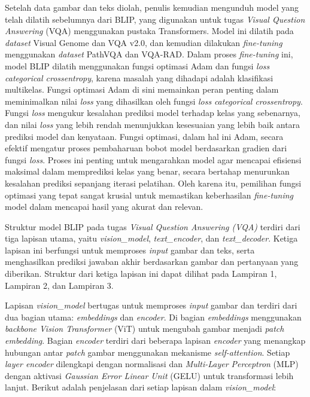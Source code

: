 \par Setelah data gambar dan teks diolah, penulis kemudian mengunduh model yang telah dilatih sebelumnya dari BLIP, yang digunakan untuk tugas \textit{Visual Question Answering} (VQA) menggunakan pustaka Transformers. Model ini dilatih pada \textit{dataset} Visual Genome dan VQA v2.0, dan kemudian dilakukan \textit{fine-tuning} menggunakan \textit{dataset} PathVQA dan VQA-RAD. Dalam proses \textit{fine-tuning} ini, model BLIP dilatih menggunakan fungsi optimasi Adam dan fungsi \textit{loss} \textit{categorical crossentropy}, karena masalah yang dihadapi adalah klasifikasi multikelas. Fungsi optimasi Adam di sini memainkan peran penting dalam meminimalkan nilai \textit{loss} yang dihasilkan oleh fungsi \textit{loss} \textit{categorical crossentropy}. Fungsi \textit{loss} mengukur kesalahan prediksi model terhadap kelas yang sebenarnya, dan nilai \textit{loss} yang lebih rendah menunjukkan kesesuaian yang lebih baik antara prediksi model dan kenyataan. Fungsi optimasi, dalam hal ini Adam, secara efektif mengatur proses pembaharuan bobot model berdasarkan gradien dari fungsi \textit{loss}. Proses ini penting untuk mengarahkan model agar mencapai efisiensi maksimal dalam memprediksi kelas yang benar, secara bertahap menurunkan kesalahan prediksi sepanjang iterasi pelatihan. Oleh karena itu, pemilihan fungsi optimasi yang tepat sangat krusial untuk memastikan keberhasilan \textit{fine-tuning} model dalam mencapai hasil yang akurat dan relevan. 

\par Struktur model BLIP pada tugas \textit{Visual Question Answering (VQA)} terdiri dari tiga lapisan utama, yaitu \textit{vision\_model}, \textit{text\_encoder}, dan \textit{text\_decoder}. Ketiga lapisan ini berfungsi untuk memproses \textit{input} gambar dan teks, serta menghasilkan prediksi jawaban akhir berdasarkan gambar dan pertanyaan yang diberikan. Struktur dari ketiga lapisan ini dapat dilihat pada Lampiran 1, Lampiran 2, dan Lampiran 3.


\par Lapisan \textit{vision\_model} bertugas untuk memproses \textit{input} gambar dan terdiri dari dua bagian utama: \textit{embeddings} dan \textit{encoder}. Di bagian \textit{embeddings} menggunakan \textit{backbone Vision Transformer} (ViT) untuk mengubah gambar menjadi \textit{patch embedding}. Bagian \textit{encoder} terdiri dari beberapa lapisan \textit{encoder} yang menangkap hubungan antar \textit{patch} gambar menggunakan mekanisme \textit{self-attention}. Setiap \textit{layer encoder} dilengkapi dengan normalisasi dan \textit{Multi-Layer Perceptron} (MLP) dengan aktivasi \textit{Gaussian Error Linear Unit} (GELU) untuk transformasi lebih lanjut. Berikut adalah penjelasan dari setiap lapisan dalam \textit{vision\_model}:

